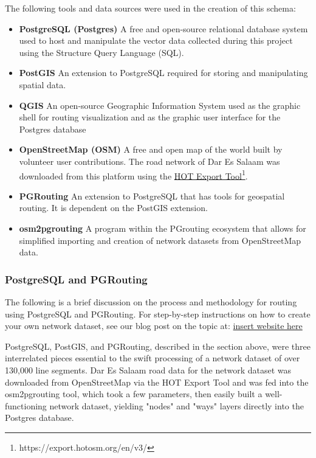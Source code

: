 \documentclass[a4paper,12pt,twoside]{article}
\begin{document}
    The following tools and data sources were used in the creation of this schema:
    
    \begin{itemize}
        \item \textbf{PostgreSQL (Postgres)}
        A free and open-source relational database system used to host and manipulate the vector data collected during this project using the Structure Query Language (SQL).
        \item \textbf{PostGIS}
        An extension to PostgreSQL required for storing and manipulating spatial data.  
        \item \textbf{QGIS}
        An open-source Geographic Information System used as the graphic shell for routing visualization and as the graphic user interface for the Postgres database
        \item \textbf{OpenStreetMap (OSM)}
        A free and open map of the world built by volunteer user contributions. The road network of Dar Es Salaam was downloaded from this platform using the \href{https://export.hotosm.org/en/v3/}{HOT Export Tool}\footnote{https://export.hotosm.org/en/v3/}.
        \item \textbf{PGRouting}
        An extension to PostgreSQL that has tools for geospatial routing. It is dependent on the PostGIS extension.
        \item \textbf{osm2pgrouting}
        A program within the PGrouting ecosystem that allows for simplified importing and creation of network datasets from OpenStreetMap data.
    \end{itemize}
    
    

\subsubsection{PostgreSQL and PGRouting}
    The following is a brief discussion on the process and methodology for routing using PostgreSQL and PGRouting. For step-by-step instructions on how to create your own network dataset, see our blog post on the topic at: \href{}{insert website here}
    
    PostgreSQL, PostGIS, and PGRouting, described in the section above, were three interrelated pieces essential to the swift processing of a network dataset of over 130,000 line segments. Dar Es Salaam road data for the network dataset was downloaded from OpenStreetMap via the HOT Export Tool and was fed into the osm2pgrouting tool, which took a few parameters, then easily built a well-functioning network dataset, yielding "nodes" and "ways" layers directly into the Postgres database.
    
\end{document}
